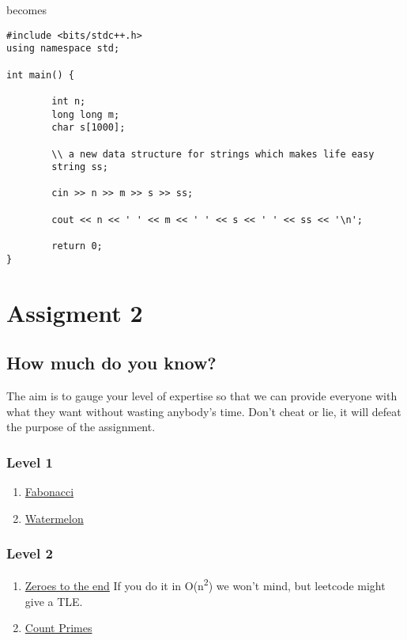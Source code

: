 \documentclass[13pt,oneside,a4paper]{book}
\begin{document}
becomes

\begin{verbatim}
#include <bits/stdc++.h>
using namespace std;

int main() {

        int n;
        long long m;
        char s[1000];

        \\ a new data structure for strings which makes life easy
        string ss;

        cin >> n >> m >> s >> ss;

        cout << n << ' ' << m << ' ' << s << ' ' << ss << '\n';

        return 0;
}
\end{verbatim}


\clearpage

\chapter{Assigment 2}
\section{How much do you know?}
The aim is to gauge your level of expertise so that we can provide everyone with what they want without wasting
anybody's time. Don't cheat or lie, it will defeat the purpose of the assignment.

\subsection{Level 1}
\begin{enumerate}
        \item \href{https://leetcode.com/problems/fibonacci-number/}{Fabonacci}
        \item \href{https://codeforces.com/contest/4/problem/A}{Watermelon}
\end{enumerate}

\subsection{Level 2}
\begin{enumerate}
        \item \href{https://leetcode.com/problems/move-zeroes/}{Zeroes to the end} If you do it in O(n\textsuperscript{2}) we won't mind, but leetcode might give a TLE.
        \item \href{https://leetcode.com/problems/count-primes/}{Count Primes}
\end{enumerate}
\end{document}

